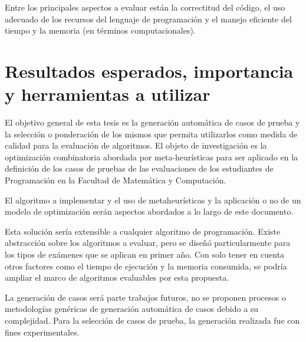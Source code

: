 \documentclass[a4paper,12pt]{book}
\begin{document}
		Entre los principales aspectos a evaluar están la correctitud del código, el uso adecuado de los recursos del lenguaje de programación y el manejo eficiente del tiempo y la memoria (en términos computacionales).
		

	\section{Resultados esperados, importancia y herramientas a utilizar}
	
		El objetivo general de esta tesis es la generación automática de casos de prueba y la selección o ponderación de los mismos que permita utilizarlos como medida de calidad para la evaluación de algoritmos.  El objeto de investigación es la optimización combinatoria abordada por meta-heurísticas \cite{OptimizacionCombinatoria} para ser aplicado en la definición de los casos de pruebas de las evaluaciones de los estudiantes de Programación en la Facultad de Matemática y Computación.
		
		El algoritmo a implementar y el uso de metaheurísticas y la aplicación o no de un modelo de optimización serán aspectos abordados a lo largo de este documento.
		
		Esta solución sería extensible a cualquier algoritmo de programación. Existe abstracción sobre los algoritmos a evaluar, pero se diseñó particularmente para los tipos de exámenes que se aplican en primer año. Con solo tener en cuenta otros factores como el tiempo de ejecución y la memoria consumida, se podría ampliar el marco de algoritmos evaluables por esta propuesta.
		
		La generación de casos será parte trabajos futuros, no se proponen procesos o metodologías genéricas de generación automática de casos debido a su complejidad. Para la selección de casos de prueba, la generación realizada fue con fines experimentales.
		
	
\end{document}
